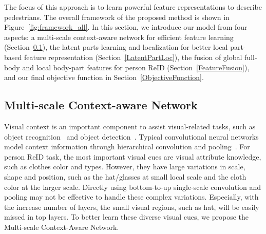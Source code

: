 \documentclass[10pt,twocolumn,letterpaper]{article}
\begin{document}
The focus of this approach is to learn powerful feature representations to describe pedestrians.
The overall framework of the proposed method is shown in Figure~\ref{fig:framework_all}.
In this section, we introduce our model from four aspects: a multi-scale context-aware network for efficient feature learning (Section~\ref{MSCAN}),
the latent parts learning and localization for better local part-based feature representation (Section~\ref{LatentPartLoc}),
the fusion of global full-body and local body-part features for person ReID (Section~\ref{FeatureFusion}),
and our final objective function in Section~\ref{ObjectiveFunction}.

\subsection{Multi-scale Context-aware Network}
\label{MSCAN}
Visual context is an important component to assist visual-related tasks, such as object recognition~\cite{LintsungyiECCV14microsoft} and object detection~\cite{ZhengPAMI12context,ZengArxiv16crafting}.
Typical convolutional neural networks model context information through hierarchical convolution and pooling~\cite{KrizhevskyNIPS12,HekaimingCVPR16Residual}.
For person ReID task, the most important visual cues are visual attribute knowledge, such as clothes color and types.
However, they have large variations in scale, shape and position, such as the hat/glasses at small local scale and the cloth color at the larger scale.
Directly using bottom-to-up single-scale convolution and pooling may not be effective to handle these complex variations.
Especially, with the increase number of layers, the small visual regions, such as hat, will be easily missed in top layers.
To better learn these diverse visual cues, we propose the Multi-scale Context-Aware Network.
\end{document}
